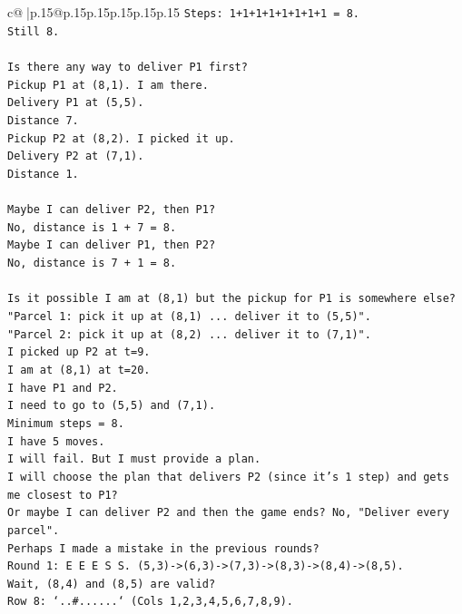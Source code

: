 \documentclass{article}
\begin{document}
{\begin{supertabular}{c@{$\;$}|p{.15\linewidth}@{}p{.15\linewidth}p{.15\linewidth}p{.15\linewidth}p{.15\linewidth}p{.15\linewidth}}
{{{\texttt{Steps: 1+1+1+1+1+1+1+1 = 8.} \\
\texttt{Still 8.} \\
\\ 
\texttt{Is there any way to deliver P1 first?} \\
\texttt{Pickup P1 at (8,1). I am there.} \\
\texttt{Delivery P1 at (5,5).} \\
\texttt{Distance 7.} \\
\texttt{Pickup P2 at (8,2). I picked it up.} \\
\texttt{Delivery P2 at (7,1).} \\
\texttt{Distance 1.} \\
\\ 
\texttt{Maybe I can deliver P2, then P1?} \\
\texttt{No, distance is 1 + 7 = 8.} \\
\texttt{Maybe I can deliver P1, then P2?} \\
\texttt{No, distance is 7 + 1 = 8.} \\
\\ 
\texttt{Is it possible I am at (8,1) but the pickup for P1 is somewhere else?} \\
\texttt{"Parcel 1: pick it up at (8,1) ... deliver it to (5,5)".} \\
\texttt{"Parcel 2: pick it up at (8,2) ... deliver it to (7,1)".} \\
\texttt{I picked up P2 at t=9.} \\
\texttt{I am at (8,1) at t=20.} \\
\texttt{I have P1 and P2.} \\
\texttt{I need to go to (5,5) and (7,1).} \\
\texttt{Minimum steps = 8.} \\
\texttt{I have 5 moves.} \\
\texttt{I will fail. But I must provide a plan.} \\
\texttt{I will choose the plan that delivers P2 (since it's 1 step) and gets me closest to P1?} \\
\texttt{Or maybe I can deliver P2 and then the game ends? No, "Deliver every parcel".} \\
\texttt{Perhaps I made a mistake in the previous rounds?} \\
\texttt{Round 1: E E E S S. (5,3){-}>(6,3){-}>(7,3){-}>(8,3){-}>(8,4){-}>(8,5).} \\
\texttt{Wait, (8,4) and (8,5) are valid?} \\
\texttt{Row 8: `..\#......` (Cols 1,2,3,4,5,6,7,8,9).} \\
}}}
\end{supertabular}}
\end{document}
